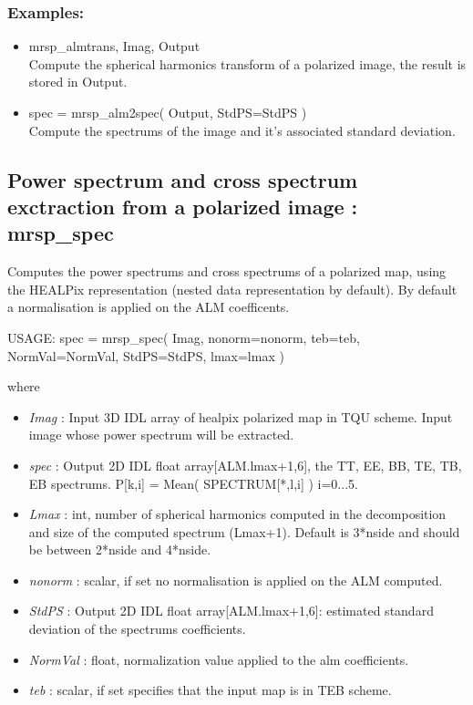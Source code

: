 \subsubsection*{Examples:} 
\begin{itemize}
\item mrsp\_almtrans, Imag, Output \\
Compute the spherical harmonics transform of a polarized image, the result is stored in Output.
\item spec = mrsp\_alm2spec( Output, StdPS=StdPS ) \\
Compute the spectrums of the image and it's associated standard deviation.
\end{itemize}



\subsection{Power spectrum and cross spectrum exctraction from a polarized image : mrsp\_spec}
Computes the power spectrums and cross spectrums of a polarized map, using the HEALPix representation (nested data representation by default). 
By default a normalisation is applied on the ALM coefficents.
{\bf
\begin{center}
     USAGE: spec = mrsp\_spec( Imag, nonorm=nonorm, teb=teb, NormVal=NormVal, StdPS=StdPS, lmax=lmax )
\end{center}}
where
\begin{itemize}
\item {\em Imag} : Input 3D IDL array of healpix polarized map in TQU scheme. Input image whose power spectrum will be extracted.
\item {\em spec} : Output 2D IDL float array[ALM.lmax+1,6], the TT, EE, BB, TE, TB, EB spectrums. P[k,i] = Mean( SPECTRUM[*,l,i] ) \quad i=0...5.
\item {\em Lmax} : int, number of spherical harmonics computed in the decomposition and size of the computed spectrum (Lmax+1). Default is 3*nside and should be between 2*nside and 4*nside.
\item {\em nonorm} : scalar, if set no normalisation is applied on the ALM computed.
\item {\em StdPS} : Output 2D IDL float array[ALM.lmax+1,6]: estimated standard deviation of the spectrums coefficients.
\item {\em NormVal} : float, normalization value applied to the alm coefficients.
\item {\em teb} : scalar, if set specifies that the input map is in TEB scheme.
\end{itemize}

